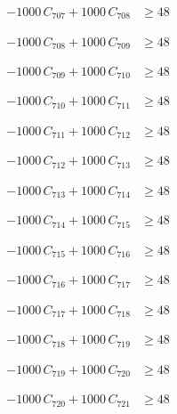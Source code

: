 \documentclass[a4paper,11pt]{article}
\begin{document}
\begin{align}
-1000\,C_{707} + 1000\,C_{708} &\geq 48 \nonumber
\end{align}

\begin{align}
-1000\,C_{708} + 1000\,C_{709} &\geq 48 \nonumber
\end{align}

\begin{align}
-1000\,C_{709} + 1000\,C_{710} &\geq 48 \nonumber
\end{align}

\begin{align}
-1000\,C_{710} + 1000\,C_{711} &\geq 48 \nonumber
\end{align}

\begin{align}
-1000\,C_{711} + 1000\,C_{712} &\geq 48 \nonumber
\end{align}

\begin{align}
-1000\,C_{712} + 1000\,C_{713} &\geq 48 \nonumber
\end{align}

\begin{align}
-1000\,C_{713} + 1000\,C_{714} &\geq 48 \nonumber
\end{align}

\begin{align}
-1000\,C_{714} + 1000\,C_{715} &\geq 48 \nonumber
\end{align}

\begin{align}
-1000\,C_{715} + 1000\,C_{716} &\geq 48 \nonumber
\end{align}

\begin{align}
-1000\,C_{716} + 1000\,C_{717} &\geq 48 \nonumber
\end{align}

\begin{align}
-1000\,C_{717} + 1000\,C_{718} &\geq 48 \nonumber
\end{align}

\begin{align}
-1000\,C_{718} + 1000\,C_{719} &\geq 48 \nonumber
\end{align}

\begin{align}
-1000\,C_{719} + 1000\,C_{720} &\geq 48 \nonumber
\end{align}

\begin{align}
-1000\,C_{720} + 1000\,C_{721} &\geq 48 \nonumber
\end{align}
\end{document}
